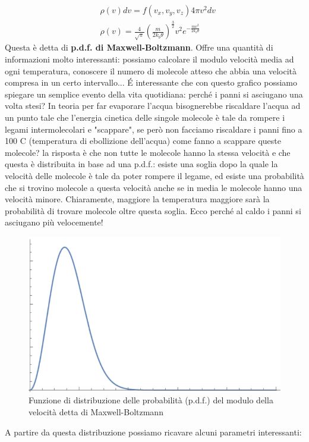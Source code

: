 \documentclass[
10pt, %
a4paper, %
oneside, %
headinclude,footinclude, %
BCOR5mm, %
]{scrartcl}
\begin{document}
\FloatBarrier
\begin{align}\label{eq:pdfMaxwellvelocità}
	&\rho(v) dv = f(v_x, v_y, v_z) 4\pi v^2 dv \nonumber \\
	&\rho(v)=\frac{4}{\sqrt{\pi}}\left(\frac{m}{2k_b\theta}\right)^{\frac{3}{2}} v^2 e^{-\frac{mv^2}{2 k_b \theta}}
\end{align} 
Questa è detta di \textbf{p.d.f. di Maxwell-Boltzmann}. Offre una quantità di informazioni molto interessanti: possiamo calcolare il modulo velocità media ad ogni temperatura, conoscere il numero di molecole atteso che abbia una velocità compresa in un certo intervallo... \'{E} interessante che con questo grafico possiamo spiegare un semplice evento della vita quotidiana: perché i panni si asciugano una volta stesi? In teoria per far evaporare l'acqua bisognerebbe riscaldare l'acqua ad un punto tale che l'energia cinetica delle singole molecole è tale da rompere i legami intermolecolari e "scappare", se però non facciamo riscaldare i panni fino a 100 \textdegree C (temperatura di ebollizione dell'acqua) come fanno a scappare queste molecole? la risposta è che non tutte le molecole hanno la stessa velocità e che questa è distribuita in base ad una p.d.f.: esiste una soglia dopo la quale la velocità delle molecole è tale da poter rompere il legame, ed esiste una probabilità che si trovino molecole a questa velocità anche se in media le molecole hanno una velocità minore. Chiaramente, maggiore la temperatura maggiore sarà la probabilità di trovare molecole oltre questa soglia. Ecco perché al caldo i panni si asciugano più velocemente!
\begin{figure}[h!]
	\centering
	\includegraphics[width=0.6\linewidth]{../images/speedpdf}
	\caption{Funzione di distribuzione delle probabilità (p.d.f.) del modulo della velocità detta di Maxwell-Boltzmann}
	\label{fig:speedpdf}
\end{figure}
\FloatBarrier
A partire da questa distribuzione possiamo ricavare alcuni parametri interessanti:
\end{document}
